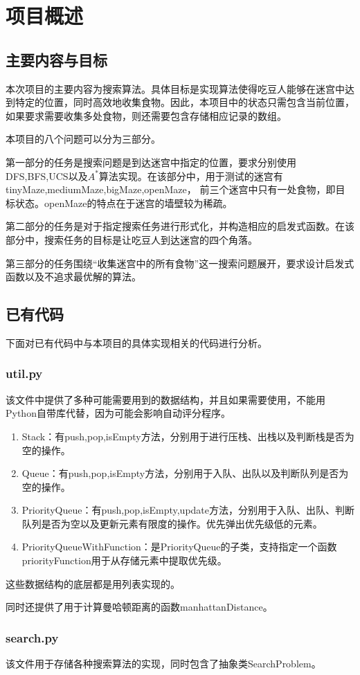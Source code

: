 \chapter{项目概述}
\section{主要内容与目标}
本次项目的主要内容为搜索算法。具体目标是实现算法使得吃豆人能够在迷宫中达到特定的位置，同时高效地收集食物。因此，本项目中的状态只需包含当前位置，
如果要求需要收集多处食物，则还需要包含存储相应记录的数组。

本项目的八个问题可以分为三部分。

第一部分的任务是搜索问题是到达迷宫中指定的位置，要求分别使用DFS,BFS,UCS以及$A^*$算法实现。在该部分中，用于测试的迷宫有tinyMaze,mediumMaze,bigMaze,openMaze，
前三个迷宫中只有一处食物，即目标状态。openMaze的特点在于迷宫的墙壁较为稀疏。

第二部分的任务是对于指定搜索任务进行形式化，并构造相应的启发式函数。在该部分中，搜索任务的目标是让吃豆人到达迷宫的四个角落。

第三部分的任务围绕“收集迷宫中的所有食物”这一搜索问题展开，要求设计启发式函数以及不追求最优解的算法。
\section{已有代码}
下面对已有代码中与本项目的具体实现相关的代码进行分析。
\subsection{util.py}
该文件中提供了多种可能需要用到的数据结构，并且如果需要使用，不能用Python自带库代替，因为可能会影响自动评分程序。
\begin{enumerate}
\item Stack：有push,pop,isEmpty方法，分别用于进行压栈、出栈以及判断栈是否为空的操作。
\item Queue：有push,pop,isEmpty方法，分别用于入队、出队以及判断队列是否为空的操作。
\item PriorityQueue：有push,pop,isEmpty,update方法，分别用于入队、出队、判断队列是否为空以及更新元素有限度的操作。优先弹出优先级低的元素。
\item PriorityQueueWithFunction：是PriorityQueue的子类，支持指定一个函数priorityFunction用于从存储元素中提取优先级。
\end{enumerate}
这些数据结构的底层都是用列表实现的。

同时还提供了用于计算曼哈顿距离的函数manhattanDistance。
\subsection{search.py}
该文件用于存储各种搜索算法的实现，同时包含了抽象类SearchProblem。

